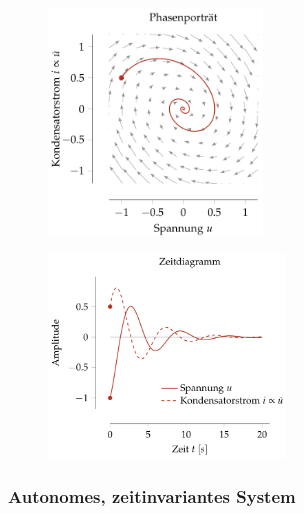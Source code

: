 \documentclass[
  10pt,
  a4paper,
  onecolumn]{article}
\numberwithin{equation}{section}
\begin{document}
\begin{figure}[H]

{\centering \includegraphics[width=5.7cm,height=\textheight]{images/state_space/quiver.png}

}

\end{figure}

\begin{figure}[H]

{\centering \includegraphics[width=6.3cm,height=\textheight]{images/state_space/time.png}

}

\end{figure}

\hypertarget{autonomes-zeitinvariantes-system}{%
\subsubsection{Autonomes, zeitinvariantes
System}\label{autonomes-zeitinvariantes-system}}

\begin{center}
\end{center}
\end{document}
